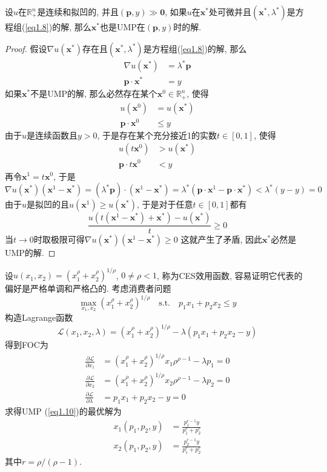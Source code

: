 \documentclass[cn, 12pt, math=mtpro2, bibstyle=apa, blue]{elegantbook}
\newcommand{\R}{\mathbb{R}}
\newcommand{\p}{\mathbf{p}}
\newcommand{\x}{\mathbf{x}}
\begin{document}
\begin{theorem}\label{thm:thm1.7}
  设$u$在$\R_+^n$是连续和拟凹的, 并且$(\p,y)\gg\mathbf{0}$, 如果$u$在$\x^\ast$处可微并且$(\x^\ast,\lambda^\ast)$是方程组(\ref{eq1.8})的解, 那么$\x^\ast$也是UMP在$(\p,y)$时的解.
\end{theorem}
\begin{proof}
  假设$\nabla u(\x^\ast)$存在且$(\x^\ast,\lambda^\ast)$是方程组(\ref{eq1.8})的解, 那么
  \begin{align*}
  \nabla u(\x^\ast)&=\lambda^\ast\p \\
  \p\cdot\x^\ast&=y
  \end{align*}
  如果$\x^\ast$不是UMP的解, 那么必然存在某个$\x^0\in \R^n_+$, 使得
  \begin{align*}
  u(\x^0)&=u(\x^\ast) \\
  \p\cdot\x^0&\leq y
  \end{align*}
  由于$u$是连续函数且$y>0$, 于是存在某个充分接近1的实数$t\in [0,1]$, 使得
  \begin{align*}
  u(t\x^0)&>u(\x^\ast) \\
  \p\cdot t\x^0&<y
  \end{align*}
  再令$\x^1=t\x^0$, 于是
  $$\nabla u(\x^\ast)(\x^1-\x^\ast)=(\lambda^\ast\p)\cdot(\x^1-\x^\ast)=\lambda^\ast(\p\cdot\x^1-\p\cdot\x^\ast)<\lambda^\ast(y-y)=0$$
  由于$u$是拟凹的且$u(\x^1)\geq u(\x^\ast)$, 于是对于任意$t\in[0,1]$都有
  $$\frac{u(t(\x^1-\x^\ast)+\x^\ast)-u(\x^\ast)}{t}\ge0$$
  当$t\to0$时取极限可得$\nabla u(\x^\ast)(\x^1-\x^\ast)\ge 0$
  这就产生了矛盾, 因此$\x^\ast$必然是UMP的解.
\end{proof}
\begin{example}
设$u(x_1,x_2)=(x_1^\rho+x_2^\rho)^{1/\rho}$, $0\ne \rho<1$, 称为CES效用函数, 容易证明它代表的偏好是严格单调和严格凸的. 考虑消费者问题
\begin{equation}\label{eq1.10}
  \max_{x_1,x_2}(x_1^\rho+x_2^\rho)^{1/\rho}\quad \text{s.t.}\quad p_1x_1+p_2x_2\leq y
\end{equation}
构造Lagrange函数
$$\mathcal{L}(x_1,x_2,\lambda)=(x_1^\rho+x_2^\rho)^{1/\rho}-\lambda(p_1x_1+p_2x_2-y)$$
得到FOC为
\begin{align*}
\frac{\partial \mathcal{L}}{\partial x_1}&=(x_1^\rho+x_2^\rho)^{1/\rho}x_1\rho^{\rho-1}-\lambda p_1=0 \\
\frac{\partial \mathcal{L}}{\partial x_2}&=(x_1^\rho+x_2^\rho)^{1/\rho}x_2\rho^{\rho-1}-\lambda p_2=0 \\
\frac{\partial \mathcal{L}}{\partial \lambda}&=p_1x_1+p_2x_2-y=0
\end{align*}
求得UMP (\ref{eq1.10})的最优解为
\begin{align*}
x_1(p_1,p_2,y)&=\frac{p_1^{r-1}y}{p_1^r+p_2^r} \\
x_2(p_1,p_2,y)&=\frac{p_2^{r-1}y}{p_1^r+p_2^r}
\end{align*}
其中$r=\rho/(\rho-1)$.
\end{example}
\end{document}
